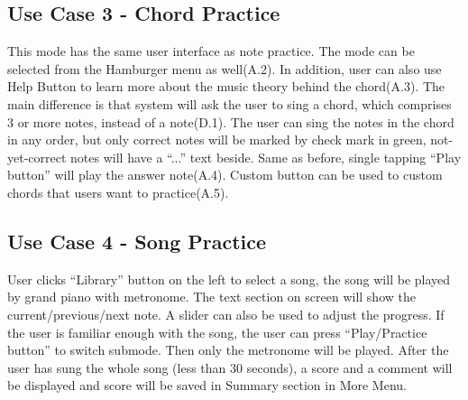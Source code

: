 \documentclass{article}
\begin{document}
\subsection{Use Case 3 - Chord Practice}
This mode has the same user interface as note practice. The mode can be selected from the Hamburger menu as well(A.2). In addition, user can also use Help Button to learn more about the music theory behind the chord(A.3). The main difference is that system will ask the user to sing a chord, which comprises 3 or more notes, instead of a note(D.1). The user can sing the notes in the chord in any order, but only correct notes will be marked by check mark in green, not-yet-correct notes will have a “...” text beside. Same as before, single tapping “Play button” will play the answer note(A.4). Custom button can be used to custom chords that users want to practice(A.5).
\subsection{Use Case 4 - Song Practice}
User clicks “Library” button on the left to select a song, the song will be played by grand piano with metronome. The text section on screen will show the current/previous/next note. A slider can also be used to adjust the progress. If the user is familiar enough with the song, the user can press “Play/Practice button” to switch submode. Then only the metronome will be played. After the user has sung the whole song (less than 30 seconds), a score and a comment will be displayed and score will be saved in Summary section in More Menu. 
      


\end{document}
